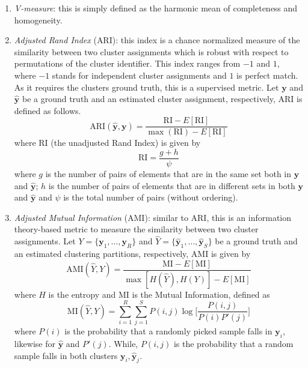 \begin{enumerate}
\begin{enumerate}[label=(\roman*)]
        	\item \textit{V-measure}: this is simply defined as the harmonic mean of completeness and homogeneity.
        	
        	\item \textit{Adjusted Rand Index} (\ac{ARI}): this index is a chance normalized measure of the similarity between two cluster assignments which is robust with respect to permutations of the cluster identifier. This index ranges from $-1$ and $1$, where $-1$ stands for independent cluster assignments and $1$ is perfect match. As it requires the clusters ground truth, this is a supervised metric. Let $\bm{y}$ and $\bm{\hat y}$ be a ground truth and an estimated cluster assignment, respectively, ARI is defined as follows.
        	\begin{equation} \label{eq:metrics_ari}
        	\text{ARI} (\bm{\hat y}, \bm{y}) = \frac{\text{RI} - E[\text{RI}]}{\max(\text{RI}) - E[\text{RI}]}
        	\end{equation}
        	where $\text{RI}$ (the unadjusted Rand Index) is given by
        	$$
        	\text{RI} = \frac{g+h}{\psi}
        	$$
        	where $g$ is the number of pairs of elements that are in the same set both in $\bm{y}$ and $\bm{\hat y}$; $h$ is the number of pairs of elements that are in different sets in both $\bm{y}$ and $\bm{\hat y}$ and $\psi$ is the total number of pairs (without ordering).
        	
        	\item \textit{Adjusted Mutual Information} (\ac{AMI}): similar to ARI, this is an information theory-based metric to measure the similarity between two cluster assignments. Let $Y = \{\bm{y}_1, \dots, \bm{y}_R \}$ and $\hat Y = \{ \bm{\hat y}_1, \dots, \bm{\hat y}_S \}$ be a ground truth and an estimated clustering partitions, respectively, AMI is given by
        	\begin{equation} \label{eq:metrics_ami}
        	\text{AMI} (\hat Y, Y) = \frac{\text{MI} - E[\text{MI}]}{\max[H(\hat Y), H(Y)]- E[\text{MI}]}
        	\end{equation}
        	where $H$ is the entropy and $\text{MI}$ is the Mutual Information, defined as
        	$$
        	\text{MI}(\hat Y, Y) = \sum_{i=1}^{R} \sum_{j=1}^{S} P(i,j) \log\bigg[ \frac{P(i,j)}{P(i)P'(j)} \bigg]
        	$$
        	where $P(i)$ is the probability that a randomly picked sample falls in $\bm{y}_i$, likewise for $\bm{\hat y}$ and $P'(j)$. While, $P(i,j)$ is the probability that a random sample falls in both clusters $\bm{y}_i,\bm{\hat y}_j$.
        	
        \end{enumerate}
    
    \end{enumerate}

